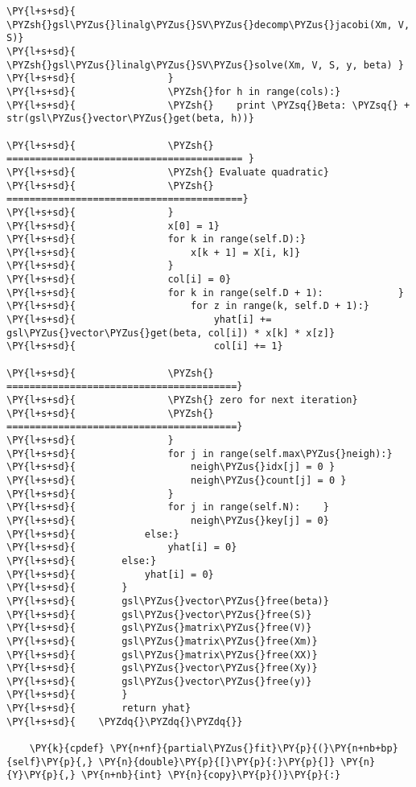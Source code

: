 \begin{Verbatim}[commandchars=\\\{\}]
\PY{l+s+sd}{                \PYZsh{}gsl\PYZus{}linalg\PYZus{}SV\PYZus{}decomp\PYZus{}jacobi(Xm, V, S)}
\PY{l+s+sd}{                \PYZsh{}gsl\PYZus{}linalg\PYZus{}SV\PYZus{}solve(Xm, V, S, y, beta) }
\PY{l+s+sd}{                }
\PY{l+s+sd}{                \PYZsh{}for h in range(cols):}
\PY{l+s+sd}{                \PYZsh{}    print \PYZsq{}Beta: \PYZsq{} + str(gsl\PYZus{}vector\PYZus{}get(beta, h))}

\PY{l+s+sd}{                \PYZsh{} ========================================= }
\PY{l+s+sd}{                \PYZsh{} Evaluate quadratic}
\PY{l+s+sd}{                \PYZsh{} =========================================}
\PY{l+s+sd}{                }
\PY{l+s+sd}{                x[0] = 1}
\PY{l+s+sd}{                for k in range(self.D):}
\PY{l+s+sd}{                    x[k + 1] = X[i, k]}
\PY{l+s+sd}{                }
\PY{l+s+sd}{                col[i] = 0}
\PY{l+s+sd}{                for k in range(self.D + 1):             }
\PY{l+s+sd}{                    for z in range(k, self.D + 1):}
\PY{l+s+sd}{                        yhat[i] += gsl\PYZus{}vector\PYZus{}get(beta, col[i]) * x[k] * x[z]}
\PY{l+s+sd}{                        col[i] += 1}

\PY{l+s+sd}{                \PYZsh{} ========================================}
\PY{l+s+sd}{                \PYZsh{} zero for next iteration}
\PY{l+s+sd}{                \PYZsh{} ========================================}
\PY{l+s+sd}{                }
\PY{l+s+sd}{                for j in range(self.max\PYZus{}neigh):}
\PY{l+s+sd}{                    neigh\PYZus{}idx[j] = 0 }
\PY{l+s+sd}{                    neigh\PYZus{}count[j] = 0 }
\PY{l+s+sd}{                }
\PY{l+s+sd}{                for j in range(self.N):    }
\PY{l+s+sd}{                    neigh\PYZus{}key[j] = 0}
\PY{l+s+sd}{            else:}
\PY{l+s+sd}{                yhat[i] = 0}
\PY{l+s+sd}{        else:}
\PY{l+s+sd}{            yhat[i] = 0}
\PY{l+s+sd}{        }
\PY{l+s+sd}{        gsl\PYZus{}vector\PYZus{}free(beta)}
\PY{l+s+sd}{        gsl\PYZus{}vector\PYZus{}free(S)}
\PY{l+s+sd}{        gsl\PYZus{}matrix\PYZus{}free(V)}
\PY{l+s+sd}{        gsl\PYZus{}matrix\PYZus{}free(Xm)}
\PY{l+s+sd}{        gsl\PYZus{}matrix\PYZus{}free(XX)}
\PY{l+s+sd}{        gsl\PYZus{}vector\PYZus{}free(Xy)}
\PY{l+s+sd}{        gsl\PYZus{}vector\PYZus{}free(y)}
\PY{l+s+sd}{        }
\PY{l+s+sd}{        return yhat}
\PY{l+s+sd}{    \PYZdq{}\PYZdq{}\PYZdq{}}

    \PY{k}{cpdef} \PY{n+nf}{partial\PYZus{}fit}\PY{p}{(}\PY{n+nb+bp}{self}\PY{p}{,} \PY{n}{double}\PY{p}{[}\PY{p}{:}\PY{p}{]} \PY{n}{Y}\PY{p}{,} \PY{n+nb}{int} \PY{n}{copy}\PY{p}{)}\PY{p}{:}


\end{Verbatim}

